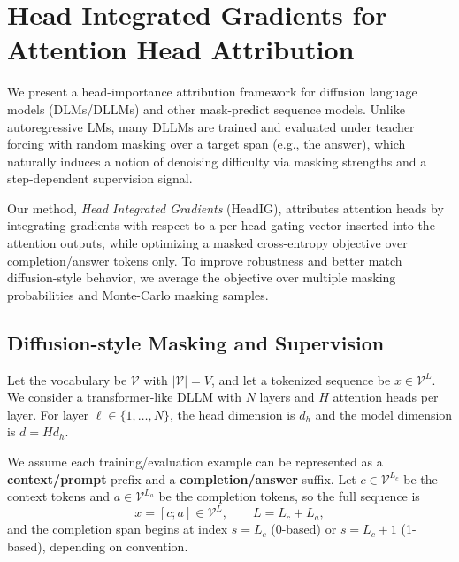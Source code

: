 

\section{Head Integrated Gradients for Attention Head Attribution}
\label{ch:method}


We present a head-importance attribution framework for diffusion language models (DLMs/DLLMs) and other mask-predict sequence models. Unlike autoregressive LMs, many DLLMs are trained and evaluated under teacher forcing with random masking over a target span (e.g., the answer), which naturally induces a notion of denoising difficulty via masking strengths and a step-dependent supervision signal.

Our method, \emph{Head Integrated Gradients} (HeadIG), attributes attention heads by integrating gradients with respect to a per-head gating vector inserted into the attention outputs, while optimizing a masked cross-entropy objective over completion/answer tokens only. To improve robustness and better match diffusion-style behavior, we average the objective over multiple masking probabilities and Monte-Carlo masking samples.

\subsection{Diffusion-style Masking and Supervision}
\label{sec:method:notation}

Let the vocabulary be $\mathcal{V}$ with $|\mathcal{V}|=V$, and let a tokenized sequence be $x \in \mathcal{V}^{L}$. We consider a transformer-like DLLM with $N$ layers and $H$ attention heads per layer. For layer $\ell \in \{1,\dots,N\}$, the head dimension is $d_h$ and the model dimension is $d = H d_h$.

We assume each training/evaluation example can be represented as a \textbf{context/prompt} prefix and a \textbf{completion/answer} suffix. Let $c \in \mathcal{V}^{L_c}$ be the context tokens and $a \in \mathcal{V}^{L_a}$ be the completion tokens, so the full sequence is
\begin{equation}
x = [c; a] \in \mathcal{V}^{L}, \qquad L = L_c + L_a,
\end{equation}
and the completion span begins at index $s = L_c$ (0-based) or $s=L_c+1$ (1-based), depending on convention.

